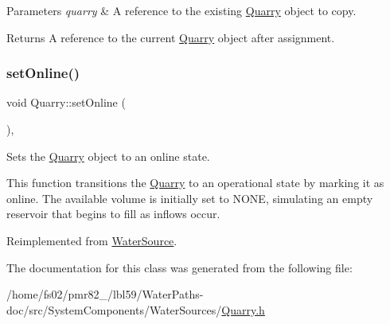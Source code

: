 \begin{DoxyParams}{Parameters}
{\em quarry} & A reference to the existing \mbox{\hyperlink{classQuarry}{Quarry}} object to copy.\\
\hline
\end{DoxyParams}
\begin{DoxyReturn}{Returns}
A reference to the current \mbox{\hyperlink{classQuarry}{Quarry}} object after assignment. 
\end{DoxyReturn}
\mbox{\label{classQuarry_af5fe04fa188d399485b2b4e64381e169}} 
\subsubsection{\texorpdfstring{set\+Online()}{setOnline()}}
{\footnotesize\ttfamily void Quarry\+::set\+Online (\begin{DoxyParamCaption}{ }\end{DoxyParamCaption})\hspace{0.3cm}{\ttfamily [override]}, {\ttfamily [virtual]}}



Sets the \mbox{\hyperlink{classQuarry}{Quarry}} object to an online state. 

This function transitions the \mbox{\hyperlink{classQuarry}{Quarry}} to an operational state by marking it as online. The available volume is initially set to {\ttfamily N\+O\+NE}, simulating an empty reservoir that begins to fill as inflows occur. 

Reimplemented from \mbox{\hyperlink{classWaterSource_aaa55dc6e14ff184380300147b53c56ec}{Water\+Source}}.



The documentation for this class was generated from the following file\+:\begin{DoxyCompactItemize}
\item 
/home/fs02/pmr82\+\_/lbl59/\+Water\+Paths-\/doc/src/\+System\+Components/\+Water\+Sources/\mbox{\hyperlink{Quarry_8h}{Quarry.\+h}}\end{DoxyCompactItemize}
